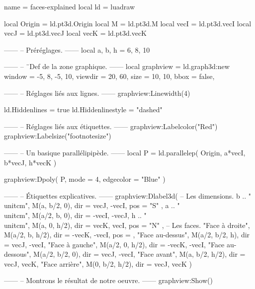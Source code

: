 \documentclass[border = 3pt]{standalone}
\begin{document}
\begin{luadraw*}{name = faces-explained}
local ld = luadraw

local Origin = ld.pt3d.Origin
local M      = ld.pt3d.M
local vecI   = ld.pt3d.vecI
local vecJ   = ld.pt3d.vecJ
local vecK   = ld.pt3d.vecK

------
-- Préréglages.
------
local a, b, h = 6, 8, 10

------
-- ¨Def de la zone graphique.
------
local graphview = ld.graph3d:new{
  window  = {-5, 8, -5, 10},
  viewdir = {20, 60},
  size    = {10, 10},
  bbox    = false,
}

------
-- Réglages liés aux lignes.
------
graphview:Linewidth(4)

ld.Hiddenlines     = true
ld.Hiddenlinestyle = "dashed"

------
-- Réglages liés aux étiquettes.
------
graphview:Labelcolor("Red")
graphview:Labelsize("footnotesize")

------
-- Un basique parallélipipède.
------
local P = ld.parallelep(
  Origin,
  a*vecI, b*vecJ, h*vecK
)

graphview:Dpoly(
  P,
  {
    mode      = 4,
    edgecolor = "Blue"
  }
)

------
-- Étiquettes explicatives.
------
graphview:Dlabel3d(
-- Les dimensions.
  b .. " \\unit{cm}", M(a, b/2, 0),
  {
    dir = {vecJ, -vecI},
    pos = "S"
  },
  a .. " \\unit{cm}", M(a/2, b, 0),
  {dir = {-vecI, -vecJ}},
  h .. " \\unit{cm}", M(a, 0, h/2),
  {
    dir = {vecK, vecI},
    pos = "N"
  },
-- Les faces.
  "Face à droite", M(a/2, b, h/2),
  {
    dir = {-vecK, -vecI},
    pos = {}
  },
  "Face au-dessus", M(a/2, b/2, h),
  {dir = {vecJ, -vecI}},
  "Face à gauche", M(a/2, 0, h/2),
  {dir = {-vecK, -vecI}},
  "Face au-dessous", M(a/2, b/2, 0),
  {dir = {vecJ, -vecI}},
  "Face avant", M(a, b/2, h/2),
  {dir = {vecJ, vecK}},
  "Face arrière", M(0, b/2, h/2),
  {dir = {vecJ, vecK}}
)

------
-- Montrons le résultat de notre oeuvre.
------
graphview:Show()
\end{luadraw*}
\end{document}
